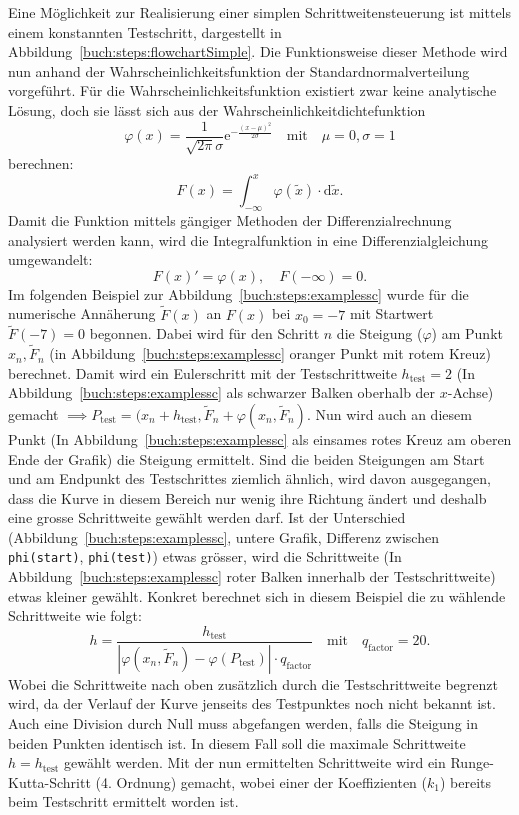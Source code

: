 Eine Möglichkeit zur Realisierung einer simplen Schrittweitensteuerung ist mittels einem konstannten Testschritt,
dargestellt in Abbildung~\ref{buch:steps:flowchartSimple}.
Die Funktionsweise dieser Methode wird nun anhand der Wahrscheinlichkeitsfunktion der Standardnormalverteilung vorgeführt.
Für die Wahrscheinlichkeitsfunktion existiert zwar keine analytische Lösung,
doch sie lässt sich aus der Wahrscheinlichkeitdichtefunktion
\[
  \varphi(x)=\frac{1}{\sqrt{2\pi}\sigma}\mathrm{e}^{-\frac{(x-\mu)^2}{2 \sigma}}\quad \text{mit} \quad \mu=0,\sigma=1
\]
berechnen:
\[
  F(x)=\int_{-\infty}^{x} \varphi (\tilde{x}) \cdot \mathrm{d} \tilde{x}.
\]
Damit die Funktion mittels gängiger Methoden der Differenzialrechnung analysiert werden kann,
wird die Integralfunktion in eine Differenzialgleichung umgewandelt:
\[
  F(x)'=\varphi(x), \quad F(-\infty)=0.
\]
Im folgenden Beispiel zur Abbildung~\ref{buch:steps:examplessc}
wurde für die numerische Annäherung $\tilde{F}(x)$ an $F(x)$ bei $x_0=-7$ mit Startwert $\tilde{F}(-7)=0$ begonnen.
Dabei wird für den Schritt $n$ die Steigung ($\varphi$) am Punkt $x_{n}, \tilde{F}_{n}$ (in Abbildung~\ref{buch:steps:examplessc} oranger Punkt mit rotem Kreuz) berechnet.
Damit wird ein Eulerschritt mit der Testschrittweite $h_\text{test}=2$ (In Abbildung~\ref{buch:steps:examplessc} als schwarzer Balken oberhalb der $x$-Achse) gemacht
$\implies P_\text{test}=(x_n+h_\text{test}, \tilde{F}_n+\varphi(x_n, \tilde{F}_n)$.
Nun wird auch an diesem Punkt (In Abbildung~\ref{buch:steps:examplessc} als einsames rotes Kreuz am oberen Ende der Grafik) die Steigung ermittelt.
Sind die beiden Steigungen am Start und am Endpunkt des Testschrittes ziemlich ähnlich, wird davon ausgegangen,
dass die Kurve in diesem Bereich nur wenig ihre Richtung ändert und deshalb eine grosse Schrittweite gewählt werden darf.
Ist der Unterschied (Abbildung~\ref{buch:steps:examplessc},
untere Grafik, Differenz zwischen \texttt{phi(start)}, \texttt{phi(test)}) etwas grösser,
wird die Schrittweite (In Abbildung~\ref{buch:steps:examplessc} roter Balken innerhalb der Testschrittweite) etwas kleiner gewählt.
Konkret berechnet sich in diesem Beispiel die zu wählende Schrittweite wie folgt:
\begin{equation}
  h=\frac{h_{\text{test}}}{|\varphi(x_n, \tilde{F}_n)-\varphi(P_{\text{test}})|\cdot q_{\text{factor}}}\quad \text{mit} \quad q_{\text{factor}}=20.
  \label{buch:steps:equationSimpleStepSize}
\end{equation}
Wobei die Schrittweite nach oben zusätzlich durch die Testschrittweite begrenzt wird,
da der Verlauf der Kurve jenseits des Testpunktes noch nicht bekannt ist.
Auch eine Division durch Null muss abgefangen werden, falls die Steigung in beiden Punkten identisch ist.
In diesem Fall soll die maximale Schrittweite $h=h_{\text{test}}$ gewählt werden.
Mit der nun ermittelten Schrittweite wird ein Runge-Kutta-Schritt (4. Ordnung) gemacht,
wobei einer der Koeffizienten ($k_1$) bereits beim Testschritt ermittelt worden ist.

